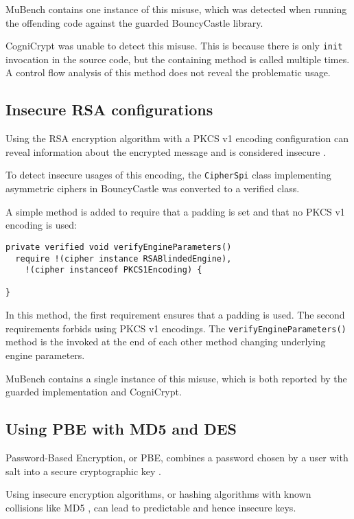 \documentclass{article}
\begin{document}
MuBench contains one instance of this misuse, which was detected when running the offending
code against the guarded BouncyCastle library.

CogniCrypt was unable to detect this misuse. This is because there is only \texttt{init}
invocation in the source code, but the containing method is called multiple times.
A control flow analysis of this method does not reveal the problematic usage.

\subsection{Insecure RSA configurations}

Using the RSA encryption algorithm with a PKCS v1 encoding configuration can reveal
information about the encrypted message and is considered insecure \cite{bleichenbacher1998chosen}.

To detect insecure usages of this encoding, the \texttt{CipherSpi} class implementing
asymmetric ciphers in BouncyCastle was converted to a verified class.

A simple method is added to require that a padding is set and that no
PKCS v1 encoding is used:

\begin{lstlisting}[style=jGuard]
private verified void verifyEngineParameters() 
  require !(cipher instance RSABlindedEngine),
    !(cipher instanceof PKCS1Encoding) {

}
\end{lstlisting}

In this method, the first requirement ensures that a padding is used.
The second requirements forbids using PKCS v1 encodings.
The \texttt{verifyEngineParameters()} method is the invoked at the end of each
other method changing underlying engine parameters.

MuBench contains a single instance of this misuse, which is both reported by
the guarded implementation and CogniCrypt.

\subsection{Using PBE with MD5 and DES}

Password-Based Encryption, or PBE, combines a password chosen by a user
with salt into a secure cryptographic key \cite{PBE_Analyzed}.

Using insecure encryption algorithms, or hashing algorithms with known collisions like MD5 \cite{md5collisions},
can lead to predictable and hence insecure keys.
\end{document}
